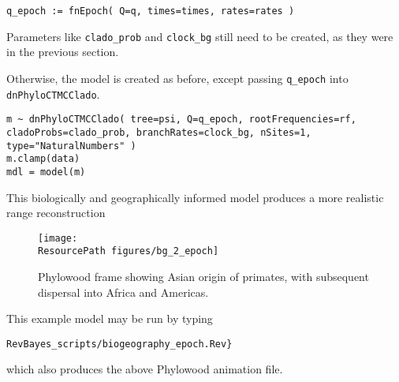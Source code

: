 \begin{snugshade}
\begin{lstlisting}
q_epoch := fnEpoch( Q=q, times=times, rates=rates )
\end{lstlisting}
\end{snugshade}

Parameters like {\tt clado\_prob} and {\tt clock\_bg} still need to be created, as they were in the previous section.

Otherwise, the model is created as before, except passing {\tt q\_epoch} into {\tt dnPhyloCTMCClado}.

\begin{snugshade}
\begin{lstlisting}
m ~ dnPhyloCTMCClado( tree=psi, Q=q_epoch, rootFrequencies=rf, cladoProbs=clado_prob, branchRates=clock_bg, nSites=1, type="NaturalNumbers" )
m.clamp(data)
mdl = model(m)
\end{lstlisting}
\end{snugshade}

This biologically and geographically informed model produces a more realistic range reconstruction

\begin{figure}[H]
\centering
\texttt{[image: \\ResourcePath figures/bg\_2\_epoch]}
\caption{Phylowood frame showing Asian origin of primates, with subsequent dispersal into Africa and Americas.}
\end{figure}


This example model may be run by typing

\begin{snugshade}
\begin{lstlisting}
RevBayes_scripts/biogeography_epoch.Rev}
\end{lstlisting}
\end{snugshade}

which also produces the above Phylowood animation file.





